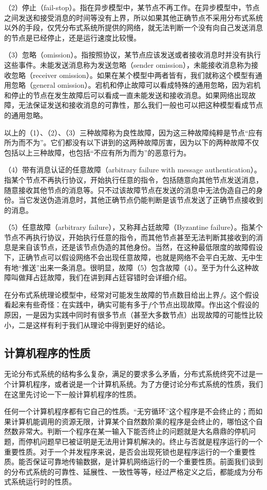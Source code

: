 \documentclass[UTF8,AutoFakeBold=1,AutoFakeSlant,zihao=-4]{cucthesis}
\begin{document}
（2）停止（fail-stop）。指在异步模型中，某节点不再工作。在异步模型中，节点之间发送和接受消息的时间等没有上界，所以如果其他正确节点不采用分布式系统以外的手段，仅凭分布式系统所提供的网络，就无法判断一个没有向自己发送消息的节点是已经停止，还是运行速度比较慢。

（3）忽略（omission）。指按照协议，某节点应该发送或者接收消息时并没有执行这些事件。未能发送消息称为发送忽略（sender omission），未能接收消息称为接收忽略（receiver omission）。如果在某个模型中两者皆有，我们就称这个模型有通用忽略（general omission）。宕机和停止故障可以看成特殊的通用忽略，因为宕机和停止的节点在发生故障后可以看成一直未能发送和接收消息。如果网络出现故障，无法保证发送和接收消息的可靠性，那么我们一般也可以把这种模型看成节点的通用忽略。

以上的（1）、（2）、（3）三种故障称为良性故障，因为这三种故障纯粹是节点“应有所为而不为”。它们都没有以下讲到的这两种故障厉害，因为以下的两种故障不仅包括以上三种故障，也包括“不应有所为而为”的恶意行为。

（4）带有消息认证的任意故障（arbitrary failure with message authentication）。指某个节点不再执行协议，开始执行任意的指令，包括随意向其他节点发送消息，随意接收其他节点的消息等。只不过该故障节点在发送的消息中无法伪造自己的身份。当它发送伪造消息时，其他正确节点仍能判断是该节点发送了正确节点接收到的消息。

（5）任意故障（arbitrary failure），又称拜占廷故障（Byzantine failure）。指某个节点不再执行协议，开始执行任意的指令，而其他节点甚至无法判断其接收到的消息是来自该节点，还是该节点伪造的其他身份。当然，在这种最低限度的故障假设下，正确节点可以假设网络不会出现任意故障，也就是网络不会平白无故、无中生有地“推送”出来一条消息。很明显，故障（5）包含故障（4）。至于为什么这种故障叫做拜占廷故障，我们在讲到拜占廷容错时会详细介绍。

在分布式系统理论模型中，经常对可能发生故障的节点数目给出上界$f$。这个假设看起来有些奇怪：在实践中，确实可能有多于$f$个节点出现故障。作出这个假设的原因，一是因为实践中同时有很多节点（甚至大多数节点）出现故障的可能性比较小，二是这样有利于我们从理论中得到更好的结论。

\subsection{计算机程序的性质}

无论分布式系统的结构多么复杂，满足的要求多么矛盾，分布式系统终究不过是一个计算机程序，或者说是一个计算机系统。为了方便讨论分布式系统的性质，我们在这里先讨论一下一般计算机程序的性质。

任何一个计算机程序都有它自己的性质。“无穷循环”这个程序是不会终止的；而如果计算机能调用的资源无限，计算某个自然数阶乘的程序是会终止的，哪怕这个自然数非常大。判断一个程序在某一输入下能否终止的问题就是大名鼎鼎的停机问题，而停机问题早已被证明是无法用计算机解决的。终止与否就是程序运行的一个重要性质。对于一个并发程序来说，是否会出现死锁也是程序运行的一个重要性质。能否保证可靠地传输数据，是计算机网络运行的一个重要性质。前面我们谈到的分布式系统的可靠性、延展性、一致性等等，经过严格定义之后，都能成为分布式系统运行时的性质。
\end{document}
